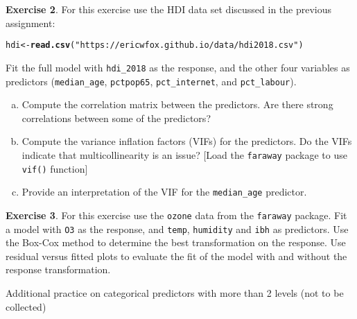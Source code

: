 \documentclass[11pt]{article}\usepackage[]{graphicx}\usepackage[]{color}
\makeatletter
\newcommand{\hlstr}[1]{\textcolor[rgb]{0.192,0.494,0.8}{#1}}%
\newcommand{\hlstd}[1]{\textcolor[rgb]{0.345,0.345,0.345}{#1}}%
\newcommand{\hlkwb}[1]{\textcolor[rgb]{0.69,0.353,0.396}{#1}}%
\newcommand{\hlkwd}[1]{\textcolor[rgb]{0.737,0.353,0.396}{\textbf{#1}}}%
\newenvironment{kframe}{%
 \def\at@end@of@kframe{}%
 \ifinner\ifhmode%
  \def\at@end@of@kframe{\end{minipage}}%
  \begin{minipage}{\columnwidth}%
 \fi\fi%
 \def\FrameCommand##1{\hskip\@totalleftmargin \hskip-\fboxsep
 \colorbox{shadecolor}{##1}\hskip-\fboxsep
     \hskip-\linewidth \hskip-\@totalleftmargin \hskip\columnwidth}%
 \MakeFramed {\advance\hsize-\width
   \@totalleftmargin\z@ \linewidth\hsize
   \@setminipage}}%
 {\par\unskip\endMakeFramed%
 \at@end@of@kframe}
\newenvironment{knitrout}{}{} %
\makeatother
\begin{document}
\textbf{Exercise 2}.  For this exercise use the HDI data set discussed in the previous assignment:

\begin{knitrout}
\color{fgcolor}\begin{kframe}
\begin{alltt}
\hlstd{hdi} \hlkwb{<-} \hlkwd{read.csv}\hlstd{(}\hlstr{"https://ericwfox.github.io/data/hdi2018.csv"}\hlstd{)}
\end{alltt}
\end{kframe}
\end{knitrout}
Fit the full model with \texttt{hdi\_2018} as the response, and the other four variables as predictors  (\texttt{median\_age}, \texttt{pctpop65}, \texttt{pct\_internet}, and \texttt{pct\_labour}).
\begin{enumerate}[(a)]
\item Compute the correlation matrix between the predictors.  Are there strong correlations between some of the predictors?
\item Compute the variance inflation factors (VIFs) for the predictors.  Do the VIFs indicate that multicollinearity is an issue? [Load the \texttt{faraway} package to use \texttt{vif()} function]
\item Provide an interpretation of the VIF for the \texttt{median\_age} predictor.\\
\end{enumerate}



\textbf{Exercise 3}.  For this exercise use the \texttt{ozone} data from the \texttt{faraway} package.   Fit a model with \texttt{O3} as the response, and \texttt{temp}, \texttt{humidity} and \texttt{ibh} as predictors.  Use the Box-Cox method to determine the best transformation on the response.  Use residual versus fitted plots to evaluate the fit of the model with and without the response transformation.\\
\vspace{11pt}



\hrulefill
\vspace{11pt}

Additional practice on categorical predictors with more than 2 levels (not to be collected)\\
\end{document}
